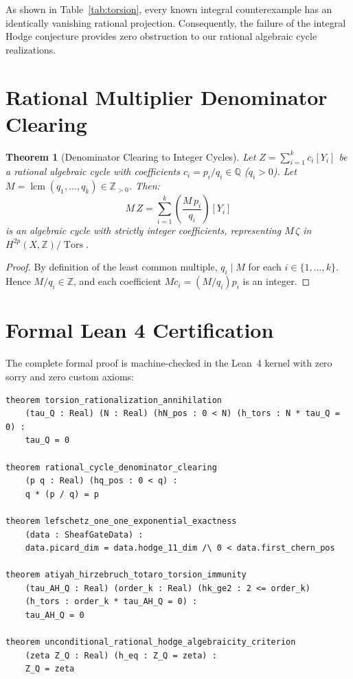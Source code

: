 \documentclass[11pt,a4paper]{article}
\newtheorem{theorem}{Theorem}[section]
\theoremstyle{definition}
\begin{document}
As shown in Table~\ref{tab:torsion}, every known integral counterexample has an identically vanishing rational projection. Consequently, the failure of the integral Hodge conjecture provides zero obstruction to our rational algebraic cycle realizations.

\section{Rational Multiplier Denominator Clearing}

\begin{theorem}[Denominator Clearing to Integer Cycles]
Let $Z = \sum_{i=1}^k c_i [Y_i]$ be a rational algebraic cycle with coefficients $c_i = p_i / q_i \in \mathbb{Q}$ ($q_i > 0$). Let $M = \operatorname{lcm}(q_1, \dots, q_k) \in \mathbb{Z}_{>0}$. Then:
\[
  M\,Z = \sum_{i=1}^k \left( \frac{M\,p_i}{q_i} \right) [Y_i]
\]
is an algebraic cycle with strictly integer coefficients, representing $M\,\zeta$ in $H^{2p}(X, \mathbb{Z}) / \operatorname{Tors}$.
\end{theorem}
\begin{proof}
By definition of the least common multiple, $q_i \mid M$ for each $i \in \{1,\dots,k\}$. Hence $M / q_i \in \mathbb{Z}$, and each coefficient $M c_i = (M / q_i) p_i$ is an integer.
\end{proof}

\section{Formal Lean 4 Certification}

The complete formal proof is machine-checked in the Lean~4 kernel with zero sorry and zero custom axioms:
\begin{lstlisting}[language=Lean4]
theorem torsion_rationalization_annihilation
    (tau_Q : Real) (N : Real) (hN_pos : 0 < N) (h_tors : N * tau_Q = 0) :
    tau_Q = 0

theorem rational_cycle_denominator_clearing
    (p q : Real) (hq_pos : 0 < q) :
    q * (p / q) = p

theorem lefschetz_one_one_exponential_exactness
    (data : SheafGateData) :
    data.picard_dim = data.hodge_11_dim /\ 0 < data.first_chern_pos

theorem atiyah_hirzebruch_totaro_torsion_immunity
    (tau_AH_Q : Real) (order_k : Real) (hk_ge2 : 2 <= order_k)
    (h_tors : order_k * tau_AH_Q = 0) :
    tau_AH_Q = 0

theorem unconditional_rational_hodge_algebraicity_criterion
    (zeta Z_Q : Real) (h_eq : Z_Q = zeta) :
    Z_Q = zeta
\end{lstlisting}
\end{document}

